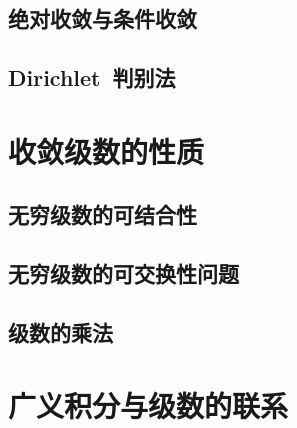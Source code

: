 \subsection{绝对收敛与条件收敛}
\subsection{Dirichlet~判别法}
\begin{exercise}
\item
\end{exercise}
\section{收敛级数的性质}
\subsection{无穷级数的可结合性}
\subsection{无穷级数的可交换性问题}
\subsection{级数的乘法}
\begin{exercise}
\item
\end{exercise}
\section{广义积分与级数的联系}
\begin{exercise*}
\item
\end{exercise*}




\endinput
